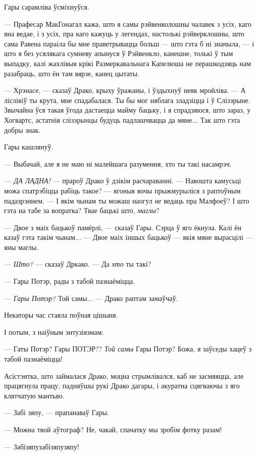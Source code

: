 Гары сарамліва ўсміхнуўся. 

--- Прафесар МакГонагал кажа, што я самы рэйвенколошны чалавек з усіх, каго яна ведае,
і з усіх, пра каго кажуць у легендах, настолькі рэйверклошны, што сама Равена параіла 
бы мне праветрывацца больш --- што гэта б ні значыла, --- і што я без усялякага сумневу 
апынуся ў Рэйвенкло, канешне, толькі ў тым выпадку, калі жахлівыя крікі Размеркавальнага 
Капелюша не перашкодзяць нам разабраць, што ён там вярзе, канец цытаты.

--- Хрэнасе, --- сказаў Драко, крыху ўражаны, і ўздыхнуў неяк мройліва. --- А ліслівіў ты крута,
мне спадабалася. Ты бы мог няблага зладзіцца і ў Слізэрыне. Звычайна ўся такая ўгода дастаецца 
майму бацьку, і я спрадзяюся, што зараз, у Хогвартс, астатнія слізэрынцы будуць падлашчвацца
да мяне... Так што гэта добры знак.

Гары кашлянуў.

--- Выбачай, але я не маю ні малейшага разумення, хто ты такі насамрэч.

\emph{--- ДА ЛАДНА!} --- прароў Драко ў дзікім расчараванні. --- Навошта камусьці можа спатрэбіцца 
рабіць такое? --- ягоныя вочы прыжмурыліся з раптоўным падазрэннем. --- І якім чынам ты можаш
наогул \emph{не} ведаць пра Малфоеў? І што гэта на табе за вопратка? Твае бацькі што, \emph{маглы}?

--- Двое з маіх бацькоў памёрлі, --- сказаў Гары. Сэрца ў яго ёкнула. Калі ён казаў гэта такім
чынам... --- Двое маіх іншых бацькоў --- якія мяне вырасцілі --- яны маглы. 

--- \emph{Што?} --- сказаў Дркако. --- Да \emph{хто} ты такі?

--- Гары Потэр, рады з табой пазнаёміцца.

--- \emph{Гары Потэр?} Той самы... --- Драко раптам замаўчаў.

Некаторы час стаяла поўная цішыня.

І потым, з наіўным энтузіязмам:

--- Гаты Потэр? Гары ПОТЭР?? \emph{Той самы} Гары Потэр? Божа, я заўседы хацеў з табой пазнаёміцца!

Асістэнтка, што займалася Драко, моцна стрымлівался, каб не засмяяцца, але 
працягнула працу, падняўшы рукі Драко дагары, і акуратна сцягваючы з яго клятчатую мантыю.

--- Забі зяпу, --- прапанаваў Гары.

--- Можна твой аўтограф? Не, чакай, спачатку мы зробім фотку разам!

--- Забізяпузабізяпузяпу!

